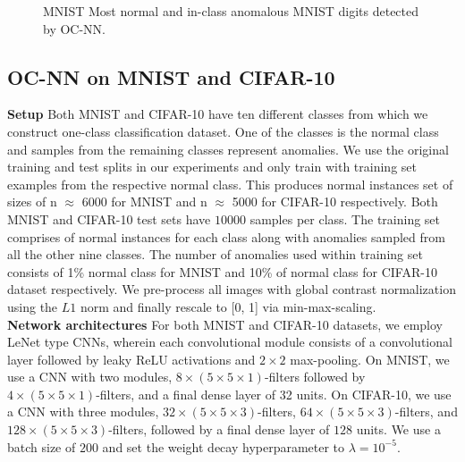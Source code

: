     \begin{figure}[htp]
      \centering
      \hspace{1em}%
      \caption{MNIST Most normal and in-class anomalous MNIST digits detected by OC-NN.}
            \label{fig:mnistOCNNresults}
    \end{figure}


\subsection{ OC-NN on MNIST and CIFAR-10}
\textbf{Setup}
Both MNIST and CIFAR-10  have ten different classes from which we construct one-class classification dataset.  One of the classes is the normal class and
samples from the remaining classes represent anomalies. We use the original training and test splits in our
experiments and only train with training set examples from
the respective normal class. This produces normal instances set of sizes
of n $\approx$ 6000 for MNIST and n $\approx$ 5000 for CIFAR-10 respectively.
Both MNIST and CIFAR-10 test sets have $10000$ samples per class.
The training set comprises of normal instances for each class along with anomalies sampled from
all the other nine classes. The number of anomalies used within training set consists of 1\% normal class for MNIST and  10\% of normal class for CIFAR-10 dataset respectively. We pre-process all images with global contrast normalization using the $L1$
norm and finally rescale to [0, 1] via min-max-scaling.\\
\textbf{Network architectures} For both MNIST and CIFAR-10 datasets, we employ LeNet type
CNNs, wherein each convolutional module consists of a convolutional layer followed by leaky ReLU activations and $2 \times 2$ max-pooling. On MNIST, we use a CNN with two modules, $8\times(5\times5\times1)$-filters followed by $4\times(5\times5\times1)$-filters, and a final dense layer of 32 units. On CIFAR-10,
we use a CNN with three modules, $32 \times (5 \times 5 \times3)$-filters,
$64\times(5\times5\times3)$-filters, and $128\times(5\times5\times3)$-filters, followed
by a final dense layer of $128$ units. We use a batch size of
$200$ and set the weight decay hyperparameter to $ \lambda= 10^{ - 5}$.\\
